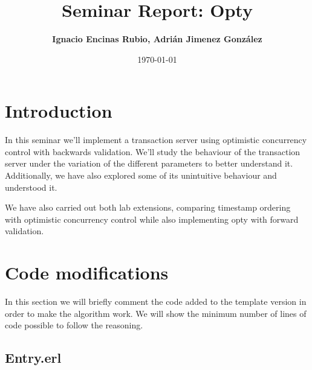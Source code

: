 \documentclass[a4paper, 10pt]{article}
\title{Seminar Report: Opty}
\author{\textbf{Ignacio Encinas Rubio, Adrián Jimenez González}}
\date{\normalsize\today{}}
\begin{document}
\maketitle

  
  

\section{Introduction}


In this seminar we'll implement a transaction server using optimistic concurrency control with backwards validation. We'll study the behaviour of the transaction server under the variation of the different parameters to better understand it. Additionally, we have also explored some of its unintuitive behaviour and understood it. 

We have also carried out both lab extensions, comparing timestamp ordering with optimistic concurrency control while also implementing opty with forward validation.

\section{Code modifications}

   In this section we will briefly comment the code added to the template version in order to
   make the algorithm work. We will show the minimum number of lines of code possible to follow the reasoning.

  \subsection{Entry.erl}
\end{document}
